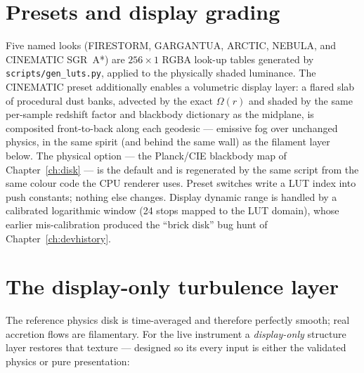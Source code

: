 \section{Presets and display grading}
\label{sec:presets}

Five named looks (FIRESTORM, GARGANTUA, ARCTIC, NEBULA, and CINEMATIC
SGR~A*) are $256\times1$
RGBA look-up tables generated by \texttt{scripts/gen\_luts.py},
applied to the physically shaded luminance. The CINEMATIC preset
additionally enables a volumetric display layer: a flared slab of
procedural dust banks, advected by the exact $\Omega(r)$ and shaded by
the same per-sample redshift factor and blackbody dictionary as the
midplane, is composited front-to-back along each geodesic — emissive
fog over unchanged physics, in the same spirit (and behind the same
wall) as the filament layer below. The physical option —
the Planck/CIE blackbody map of Chapter~\ref{ch:disk} — is the default
and is regenerated by the same script from the same colour code the CPU
renderer uses. Preset switches write a LUT index into push constants;
nothing else changes. Display dynamic range is handled by a calibrated
logarithmic window (24 stops mapped to the LUT domain), whose earlier
mis-calibration produced the ``brick disk'' bug hunt of
Chapter~\ref{ch:devhistory}.

\section{The display-only turbulence layer}
\label{sec:turbulence}

The reference physics disk is time-averaged and therefore perfectly
smooth; real accretion flows are filamentary. For the live instrument a
\emph{display-only} structure layer restores that texture — designed so
its every input is either the validated physics or pure presentation:

